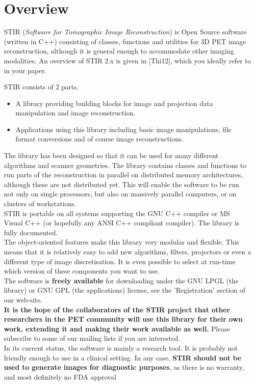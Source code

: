 \documentclass{article}
\begin{document}
\section{
Overview}

STIR (\textit{Software for Tomographic Image Reconstruction}) is Open 
Source software (written in C++) consisting of classes, functions 
and utilities for 3D PET image reconstruction, although it is 
general enough to accommodate other imaging modalities. An overview
of STIR 2.x is given in [Thi12], which you ideally refer to in your paper.

STIR consists of 2 parts. 
\begin{itemize}
\item
A library providing building blocks for image and projection 
data manipulation and image reconstruction.
\item
Applications using this library including basic image manipulations, 
file format conversions and of course image reconstructions.
\end{itemize}

The library has been designed so that it can be used for many 
different algorithms and scanner geometries. The library contains 
classes and functions to run parts of the reconstruction in parallel 
on distributed memory architectures, although these are not distributed 
yet. This will enable the software to be run not only on single 
processors, but also on massively parallel computers, or on clusters 
of workstations. \\
STIR is portable on all systems supporting the GNU C++ compiler 
or MS Visual C++ (or hopefully any ANSI C++ compliant compiler). 
The library is fully documented.\\
The object-oriented features make this library very modular and 
flexible. This means that it is relatively easy to add new algorithms, 
filters, projectors or even a different type of image discretisation. 
It is even possible to select at run-time which version of these 
components you want to use.\\
The software is \textbf{freely available} for downloading under the 
GNU LPGL (the library) or GNU GPL (the applications) license, 
see the 'Registration' section of our web-site. \\
\textbf{It is the hope of the collaborators of the STIR project that 
other researchers in the PET community will use this library 
for their own work, extending it and making their work available 
as well.} Please subscribe to some of our mailing 
lists if you are interested. \\
In its current status, the software is mainly a research tool. 
It is probably not friendly enough to use in a clinical setting. In any 
case, \textbf{STIR should not be used to generate images for diagnostic
purposes}, as there is no warranty, and most definitely no FDA approval
\end{document}
